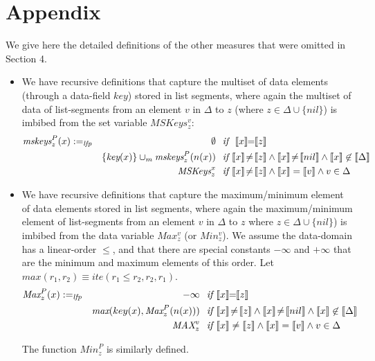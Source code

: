 \newpage
\section*{Appendix}
We give here the detailed definitions of the other  measures that were omitted in Section 4.

\begin{itemize}
\item We have recursive definitions that capture the multiset of data elements (through a data-field
    $\textit{key}$) stored in list segments, 
    where again the multiset of data 
of list-segments from an element $v$ in $\Delta$ to $z$ (where $z \in \Delta \cup \{nil\}$) is imbibed from the set variable $MSKeys_z^v$:
\begin{align*}
\textit{mskeys}_z^P(x) & :=_{\textit{lfp}} & \emptyset & \textit{~~if~} \ \sem{x}\!\!=\!\!\sem{z} \\
& & \{\textit{key}(x)\} \cup_m \textit{mskeys}_z^P(n(x)) & \textit{~~if~} \sem{x} \!\not =\! \sem{z} \wedge \sem{x} \!\not =\! \sem{nil} \wedge \sem{x} \not \in \sem{\Delta} \\
& & \textit{MSKeys}_z^x & \textit{~~if~} \sem{x} \!\not =\! \sem{z} \wedge \sem{x}=\sem{v} \wedge v \in \Delta 
\end{align*}

    \item We have recursive definitions that capture the maximum/minimum element of data elements stored in list segments, where again the maximum/minimum element  
of list-segments from an element $v$ in $\Delta$ to $z$ where $z \in \Delta \cup \{nil\}$) is imbibed from the data variable $Max_z^v$ (or $Min_z^v$).
We assume the data-domain has a linear-order $\leq$, and that there are special constants $-\infty$ and $+\infty$
that are the minimum and maximum elements of this order. Let $max(r_1,r_2) \equiv \textit{ite}(r_1 \leq r_2, r_2, r_1)$.
\begin{align*}
\textit{Max}_z^P(x) & :=_{\textit{lfp}} & -\infty & \textit{~~if~} \sem{x}\!\!=\!\!\sem{z} \\
& & \textit{max}(key(x), \textit{Max}_z^P(n(x))) & \textit{~~if~} \sem{x} \!\not =\! \sem{z} \wedge \sem{x} \!\not=\! \sem{nil} \wedge \sem{x} \not \in \sem{\Delta} \\
& & \textit{MAX}_z^v & \textit{~~if~} \sem{x} \not = \sem{z} \wedge \sem{x} = \sem{v} \wedge v \in \Delta 
\end{align*}

 The function $\textit{Min}_z^P$ is similarly defined.
 

\end{itemize}
